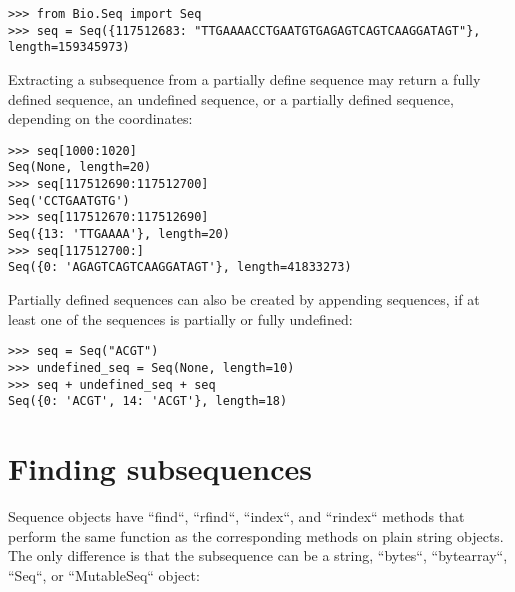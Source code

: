 \begin{verbatim}
>>> from Bio.Seq import Seq
>>> seq = Seq({117512683: "TTGAAAACCTGAATGTGAGAGTCAGTCAAGGATAGT"}, length=159345973)
\end{verbatim}

Extracting a subsequence from a partially define sequence may return a fully defined sequence, an undefined sequence, or a partially defined sequence, depending on the coordinates:

\begin{verbatim}
>>> seq[1000:1020]
Seq(None, length=20)
>>> seq[117512690:117512700]
Seq('CCTGAATGTG')
>>> seq[117512670:117512690]
Seq({13: 'TTGAAAA'}, length=20)
>>> seq[117512700:]
Seq({0: 'AGAGTCAGTCAAGGATAGT'}, length=41833273)
\end{verbatim}

Partially defined sequences can also be created by appending sequences, if at least one of the sequences is partially or fully undefined:
\begin{verbatim}
>>> seq = Seq("ACGT")
>>> undefined_seq = Seq(None, length=10)
>>> seq + undefined_seq + seq
Seq({0: 'ACGT', 14: 'ACGT'}, length=18)
\end{verbatim}

\section{Finding subsequences}

Sequence objects have ``find``, ``rfind``, ``index``, and ``rindex`` methods
that perform the same function as the corresponding methods on plain string
objects. The only difference is that the subsequence can be a string, ``bytes``,
``bytearray``, ``Seq``, or ``MutableSeq`` object:

